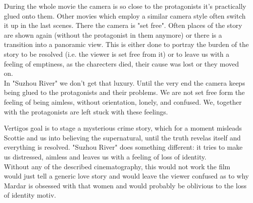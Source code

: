 \documentclass[fleqn,14pt]{article}
\begin{document}
During the whole movie the camera is so close to the protagonists it's practically glued onto them. Other movies which employ
a similar camera style often switch it up in the last scenes. There the camera is "set free". Often places of the story are shown again
(without the protagonist in them anymore) or there is a transition into a panoramic view. This is either done 
to portray the burden of the story to be resolved (i.e. the viewer is set free from it) or to leave us with a feeling of emptiness,
as the charecters died, their cause was lost or they moved on.\\
In "Suzhou River" we don't get that luxury. Until the very end the camera keeps being glued
to the protagonists and their problems. We are not set free form the feeling of being aimless, without orientation, lonely,
and confused. We, together with the protagonists are left stuck with these feelings.

Vertigos goal is to stage a mysterious crime story, which for a moment misleads
Scottie and us into believing the supernatural, until the truth revelas itself and everything is resolved. "Suzhou River" does
something different: it tries to make us distressed, aimless and leaves us with a feeling of loss of identity.  \\
Without any of the described cinematography, this would not work the film would just tell a generic love story and
would leave the viewer confused as to why Mardar is obsessed with that women and would probably be oblivious to the
loss of identity motiv.









\printbibliography 
\end{document}
